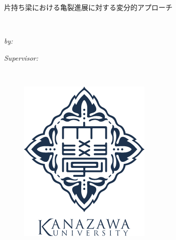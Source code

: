 \documentclass[11pt, oneside]{Thesis} %
\begin{document}
\begin{titlepage}
\begin{center}

\textsc{\LARGE \univname}\\[1cm] %

{\huge \bfseries \ttitle \\
	\huge 
	\begin{CJK}{UTF8}{min}
		片持ち梁における亀裂進展に対する変分的アプローチ
	\end{CJK}
}\\[1cm] %

\begin{minipage}{0.5\textwidth}
\begin{flushleft} \Large
\emph{by:}\\
{\authornames} %
\end{flushleft}
\end{minipage}
\begin{minipage}{0.4\textwidth}
\begin{flushright} \Large
\emph{Supervisor:} \\
{\supname} %
\end{flushright}
\end{minipage}\\[2.0cm]

\begin{figure}[htbp]
	\centering
	\includegraphics[width=0.35\linewidth]{Figures/kulogo}
\end{figure}
\vspace{1.5cm}


\end{center}
\end{titlepage}
\end{document}
